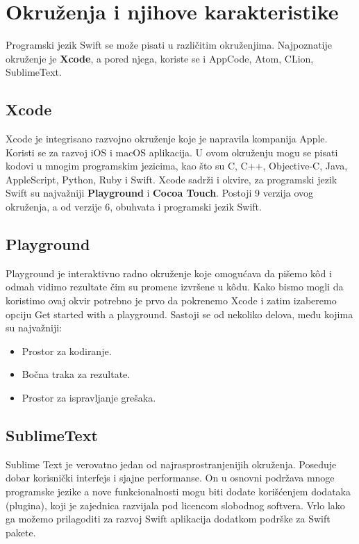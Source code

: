 \documentclass[a4paper]{article}
\begin{document}
\section{Okruženja i njihove karakteristike}	
\label{sec:petiDeo}
Programski jezik Swift se može pisati u različitim okruženjima. Najpoznatije okruženje je \textbf{Xcode}, a pored njega, koriste se i AppCode, Atom, CLion, SublimeText.

\subsection{Xcode}
\label{subsec:podnaslovXcode}
Xcode  je integrisano razvojno okruženje koje je napravila kompanija Apple. Koristi se za razvoj iOS i macOS aplikacija. U ovom okruženju mogu se pisati kodovi u mnogim programskim jezicima, kao što su C, C++, Objective-C, Java, AppleScript, Python, Ruby i Swift. Xcode sadrži i okvire, za programski jezik Swift su najvažniji \textbf{Playground} i \textbf{Cocoa Touch}. 
Postoji 9 verzija ovog okruženja, a od verzije 6, obuhvata i programski jezik Swift.

\subsection{Playground}
\label{subsec:podnaslovPlayground}
Playground  je interaktivno radno okruženje koje omogućava da pišemo k\^{o}d i odmah vidimo rezultate čim su promene izvršene u k\^{o}du. Kako bismo mogli da koristimo ovaj okvir potrebno je prvo da pokrenemo Xcode i zatim izaberemo opciju Get started with a playground. Sastoji se od nekoliko delova, među kojima su najvažniji: 
\begin{itemize}
\item Prostor za kodiranje.
\item Bočna traka za rezultate.
\item Prostor za ispravljanje grešaka.
\end{itemize}

\subsection{SublimeText}
\label{subsec:podnaslovSublimeText}
Sublime Text  je verovatno jedan od najrasprostranjenijih okruženja. Poseduje dobar korisnički interfejs i sjajne performanse. On u osnovni podržava mnoge programske jezike a nove funkcionalnosti mogu biti dodate korišćenjem dodataka (plugina), koji je zajednica razvijala pod licencom slobodnog softvera. Vrlo lako ga možemo prilagoditi za razvoj Swift aplikacija dodatkom podrške za Swift pakete.
\end{document}
